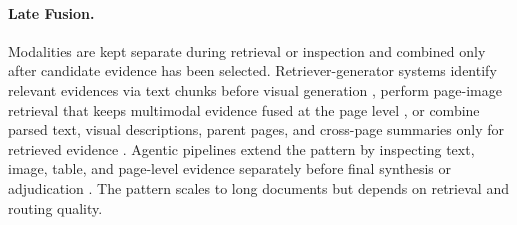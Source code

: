 \documentclass[11pt]{article}
\begin{document}
\paragraph{Late Fusion.}
Modalities are kept separate during retrieval or inspection and combined only after candidate evidence has been selected. Retriever-generator systems identify relevant evidences via text chunks before visual generation \cite{zhang2024cream}, perform page-image retrieval that keeps multimodal evidence fused at the page level \cite{cho2024m3docrag}, or combine parsed text, visual descriptions, parent pages, and cross-page summaries only for retrieved evidence \cite{gong2025mhier}. Agentic pipelines extend the pattern by inspecting text, image, table, and page-level evidence separately before final synthesis or adjudication \cite{han2025mdocagent, duan2025m2rag, zhu2025doclens}. The pattern scales to long documents but depends on retrieval and routing quality.


% 

\end{document}
